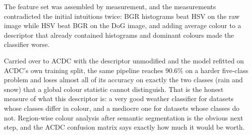 \documentclass[10pt, conference, letterpaper]{IEEEtran}
\begin{document}
The feature set was assembled by measurement, and the measurements contradicted the initial intuitions twice: BGR histograms beat HSV on the raw image while HSV beat BGR on the DoG image, and adding average colour to a descriptor that already contained histograms and dominant colours made the classifier worse.

Carried over to ACDC with the descriptor unmodified and the model refitted on ACDC's own training split, the same pipeline reaches 90.6\% on a harder five-class problem and loses almost all of its accuracy on exactly the two classes (rain and snow) that a global colour statistic cannot distinguish. That is the honest measure of what this descriptor is: a very good weather classifier for datasets whose classes differ in colour, and a mediocre one for datasets whose classes do not. Region-wise colour analysis after semantic segmentation is the obvious next step, and the ACDC confusion matrix says exactly how much it would be worth.



\end{document}
